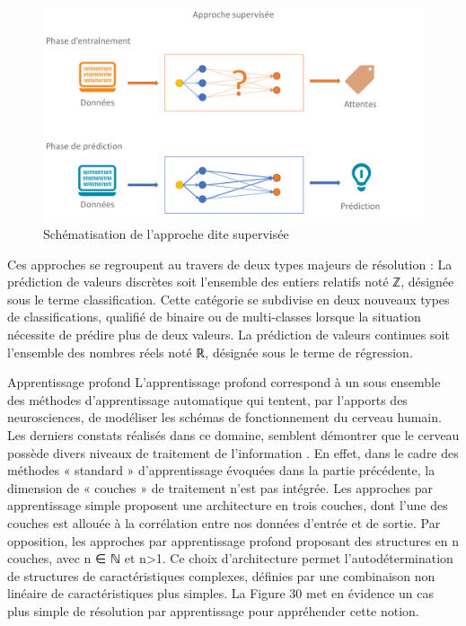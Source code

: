 \begin{figure}[H]
    \centering
    \includegraphics[width=\linewidth]{contents/chapter_3/resources/SupervisedClassification.pdf}
    \caption{Schématisation de l’approche dite supervisée}
    \label{fig:chapter_3:supervised_classification}
\end{figure}

Ces approches se regroupent au travers de deux types majeurs de résolution :
	La prédiction de valeurs discrètes soit l’ensemble des entiers relatifs noté ℤ, désignée sous le terme classification. Cette catégorie se subdivise en deux nouveaux types de classifications, qualifié de binaire ou de multi-classes lorsque la situation nécessite de prédire plus de deux valeurs.
	La prédiction de valeurs continues soit l’ensemble des nombres réels noté ℝ, désignée sous le terme de régression.

Apprentissage profond
L’apprentissage profond correspond à un sous ensemble des méthodes d’apprentissage automatique qui tentent, par l’apports des neurosciences, de modéliser les schémas de fonctionnement du cerveau humain. Les derniers constats réalisés dans ce domaine, semblent démontrer que le cerveau possède divers niveaux de traitement de l’information . 
En effet, dans le cadre des méthodes « standard » d’apprentissage évoquées dans la partie précédente, la dimension de « couches » de traitement n’est pas intégrée. Les approches par apprentissage simple proposent une architecture en trois couches, dont l’une des couches est allouée à la corrélation entre nos données d’entrée et de sortie. Par opposition, les approches par apprentissage profond proposant des structures en n couches, avec n ∈ ℕ et n>1. 
Ce choix d’architecture permet l’autodétermination de structures de caractéristiques complexes, définies par une combinaison non linéaire de caractéristiques plus simples. La  Figure 30 met en évidence un cas plus simple de résolution par apprentissage pour appréhender cette notion. 
 
